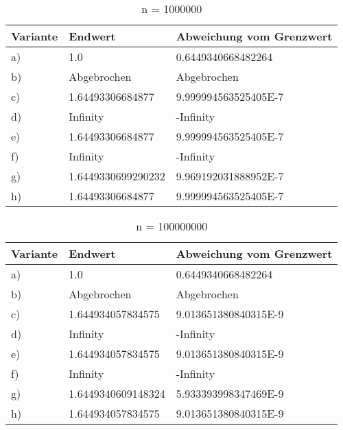 \begin{table}[ht] 
 \begin{tabular}{l | l | l} 
 
Variante & Endwert & Abweichung vom Grenzwert \\ 
 \hline 

a) &1.0&0.6449340668482264\\ 
b) &Abgebrochen&Abgebrochen\\ 
c) &1.64493306684877&9.999994563525405E-7\\ 
d) &Infinity&-Infinity\\ 
e) &1.64493306684877&9.999994563525405E-7\\ 
f) &Infinity&-Infinity\\ 
g) &1.6449330699290232&9.969192031888952E-7\\ 
h) &1.64493306684877&9.999994563525405E-7\\ 
\end{tabular} 
 \caption{n = 1000000} 
 \end{table}



\begin{table}[ht] 
 \begin{tabular}{l | l | l} 
 
Variante & Endwert & Abweichung vom Grenzwert \\ 
 \hline 

a) &1.0&0.6449340668482264\\ 
b) &Abgebrochen&Abgebrochen\\ 
c) &1.644934057834575&9.013651380840315E-9\\ 
d) &Infinity&-Infinity\\ 
e) &1.644934057834575&9.013651380840315E-9\\ 
f) &Infinity&-Infinity\\ 
g) &1.6449340609148324&5.933393998347469E-9\\ 
h) &1.644934057834575&9.013651380840315E-9\\ 
\end{tabular} 
 \caption{n = 100000000} 
 \end{table}


